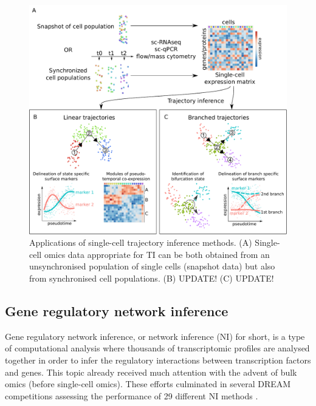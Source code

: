 \begin{figure}[htb!]
  \centering\includegraphics[width=\Largefigure]{fig/trajectory_inference_slim} %
  \caption{
    Applications of single-cell trajectory inference methods. (A) Single-cell omics data appropriate for TI can be both obtained from an unsynchronised population of single cells (snapshot data) but also from synchronised cell populations. (B) UPDATE! (C) UPDATE!
  }
  \label{fig:trajectory_inference}
\end{figure}


\subsection{Gene regulatory network inference}
Gene regulatory network inference, or network inference (NI) for short, is a type of computational analysis where thousands of transcriptomic profiles are analysed together in order to infer the regulatory interactions between transcription factors and genes. This topic already received much attention with the advent of bulk omics (before single-cell omics). These efforts culminated in several DREAM competitions assessing the performance of 29 different NI methods \cite{marbach_revealingstrengthsweaknesses_2010, marbach_wisdomcrowdsrobust_2012}. 

